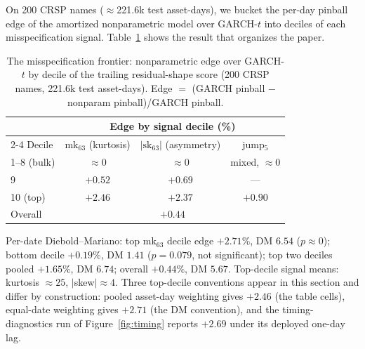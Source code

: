 \documentclass[11pt]{article}
\theoremstyle{remark}
\begin{document}
On 200 CRSP names ($\approx$221.6k test asset-days), we bucket the per-day
pinball edge of the amortized nonparametric model over GARCH-$t$ into
deciles of each misspecification signal.
Table~\ref{tab:frontier} shows the result that organizes the paper.

\begin{table}[t]
\centering
\begin{threeparttable}
\caption{The misspecification frontier: nonparametric edge over
GARCH-$t$ by decile of the trailing residual-shape score (200 CRSP
names, 221.6k test asset-days). Edge $=$ (GARCH pinball $-$ nonparam
pinball)/GARCH pinball.}
\label{tab:frontier}
\begin{tabular}{lccc}
\toprule
& \multicolumn{3}{c}{Edge by signal decile (\%)} \\
\cmidrule(lr){2-4}
Decile & $\mathrm{mk}_{63}$ (kurtosis) & $|\mathrm{sk}_{63}|$ (asymmetry) & jump$_5$ \\
\midrule
1--8 (bulk) & $\approx 0$ & $\approx 0$ & mixed, $\approx 0$ \\
9 & $+0.52$ & $+0.69$ & --- \\
10 (top) & $\mathbf{+2.46}$ & $\mathbf{+2.37}$ & $+0.90$ \\
\midrule
Overall & \multicolumn{3}{c}{$+0.44$} \\
\bottomrule
\end{tabular}
\begin{tablenotes}\footnotesize
\item Per-date Diebold--Mariano: top $\mathrm{mk}_{63}$ decile edge
$+2.71\%$, DM $6.54$ ($p \approx 0$); bottom decile $+0.19\%$, DM $1.41$
($p = 0.079$, not significant); top two deciles pooled $+1.65\%$, DM
$6.74$; overall $+0.44\%$, DM $5.67$. Top-decile signal means: kurtosis
$\approx 25$, $|$skew$| \approx 4$. Three top-decile conventions
appear in this section and differ by construction: pooled asset-day
weighting gives $+2.46$ (the table cells), equal-date weighting gives
$+2.71$ (the DM convention), and the timing-diagnostics run of
Figure~\ref{fig:timing} reports $+2.69$ under its deployed one-day
lag.
\end{tablenotes}
\end{threeparttable}
\end{table}
\end{document}
